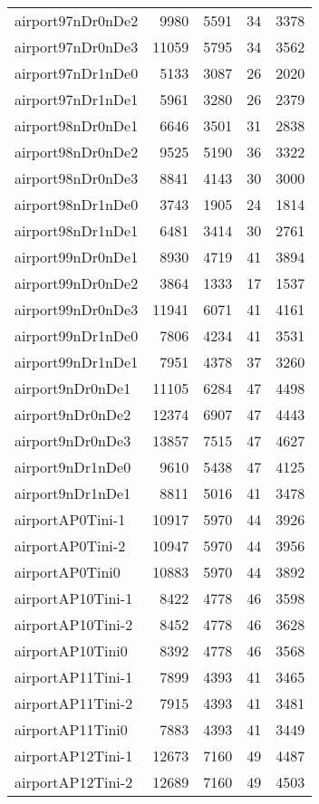 \documentclass[../../../thesis.tex]{subfiles}
\begin{document}
\begin{longtable}{lrrrr}
airport97nDr0nDe2 & 9980 & 5591 & 34 & 3378 \\
airport97nDr0nDe3 & 11059 & 5795 & 34 & 3562 \\
airport97nDr1nDe0 & 5133 & 3087 & 26 & 2020 \\
airport97nDr1nDe1 & 5961 & 3280 & 26 & 2379 \\
airport98nDr0nDe1 & 6646 & 3501 & 31 & 2838 \\
airport98nDr0nDe2 & 9525 & 5190 & 36 & 3322 \\
airport98nDr0nDe3 & 8841 & 4143 & 30 & 3000 \\
airport98nDr1nDe0 & 3743 & 1905 & 24 & 1814 \\
airport98nDr1nDe1 & 6481 & 3414 & 30 & 2761 \\
airport99nDr0nDe1 & 8930 & 4719 & 41 & 3894 \\
airport99nDr0nDe2 & 3864 & 1333 & 17 & 1537 \\
airport99nDr0nDe3 & 11941 & 6071 & 41 & 4161 \\
airport99nDr1nDe0 & 7806 & 4234 & 41 & 3531 \\
airport99nDr1nDe1 & 7951 & 4378 & 37 & 3260 \\
airport9nDr0nDe1 & 11105 & 6284 & 47 & 4498 \\
airport9nDr0nDe2 & 12374 & 6907 & 47 & 4443 \\
airport9nDr0nDe3 & 13857 & 7515 & 47 & 4627 \\
airport9nDr1nDe0 & 9610 & 5438 & 47 & 4125 \\
airport9nDr1nDe1 & 8811 & 5016 & 41 & 3478 \\
airportAP0Tini-1 & 10917 & 5970 & 44 & 3926 \\
airportAP0Tini-2 & 10947 & 5970 & 44 & 3956 \\
airportAP0Tini0 & 10883 & 5970 & 44 & 3892 \\
airportAP10Tini-1 & 8422 & 4778 & 46 & 3598 \\
airportAP10Tini-2 & 8452 & 4778 & 46 & 3628 \\
airportAP10Tini0 & 8392 & 4778 & 46 & 3568 \\
airportAP11Tini-1 & 7899 & 4393 & 41 & 3465 \\
airportAP11Tini-2 & 7915 & 4393 & 41 & 3481 \\
airportAP11Tini0 & 7883 & 4393 & 41 & 3449 \\
airportAP12Tini-1 & 12673 & 7160 & 49 & 4487 \\
airportAP12Tini-2 & 12689 & 7160 & 49 & 4503 \\

\end{longtable}
\end{document}
